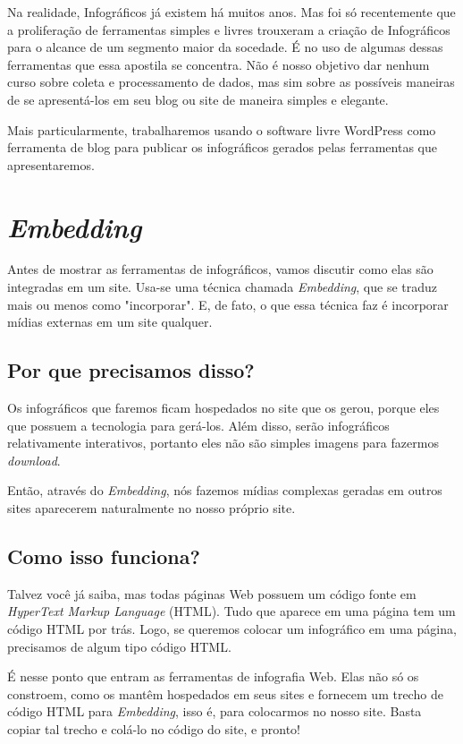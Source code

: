\documentclass[12pt,onecolumn]{article}
\begin{document}
  Na realidade, Infográficos já existem há muitos anos. Mas foi só recentemente
  que a proliferação de ferramentas simples e livres trouxeram a criação de
  Infográficos para o alcance de um segmento maior da socedade. É no uso de
  algumas dessas ferramentas que essa apostila se concentra. Não é nosso
  objetivo dar nenhum curso sobre coleta e processamento de dados, mas sim sobre
  as possíveis maneiras de se apresentá-los em seu blog ou site de maneira
  simples e elegante.
  
  Mais particularmente, trabalharemos usando o software livre WordPress como
  ferramenta de blog para publicar os infográficos gerados pelas ferramentas que
  apresentaremos.

\clearpage
\section{\textit{Embedding}}
  Antes de mostrar as ferramentas de infográficos, vamos discutir como elas são
  integradas em um site. Usa-se uma técnica chamada \textit{Embedding}, que se
  traduz mais ou menos como "incorporar". E, de fato, o que essa técnica faz é
  incorporar mídias externas em um site qualquer.
  
  \subsection{Por que precisamos disso?}
    Os infográficos que faremos ficam hospedados no site que os gerou, porque
    eles que possuem a tecnologia para gerá-los. Além disso, serão infográficos
    relativamente interativos, portanto eles não são simples imagens para
    fazermos \textit{download}.
    
    Então, através do \textit{Embedding}, nós fazemos mídias complexas geradas
    em outros sites aparecerem naturalmente no nosso próprio site.
  
  \subsection{Como isso funciona?}
    Talvez você já saiba, mas todas páginas Web possuem um código fonte em
    \textit{HyperText Markup Language} (HTML). Tudo que aparece em uma página
    tem um código HTML por trás. Logo, se queremos colocar um infográfico em
    uma página, precisamos de algum tipo código HTML.
    
    É nesse ponto que entram as ferramentas de infografia Web. Elas não só os
    constroem, como os mantêm hospedados em seus sites e fornecem um trecho de
    código HTML para \textit{Embedding}, isso é, para colocarmos no nosso site.
    Basta copiar tal trecho e colá-lo no código do site, e pronto!
    
\end{document}
